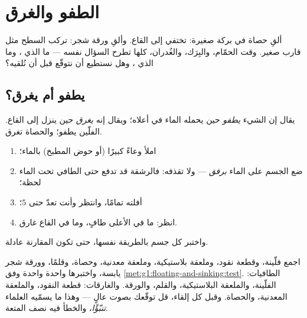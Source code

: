 \chapter{الطفو والغرق}\label{ch:g1:floating-and-sinking}

ألقِ حصاة في بركة صغيرة: تختفي إلى القاع. وألقِ ورقة شجر: تركب
السطح مثل قارب صغير. وقت الحمّام، والبِرَك، والغُدران، كلها تطرح
السؤال نفسه --- ما الذي ، وما الذي ، وهل نستطيع أن نتوقّع
قبل أن نُلقيه؟

\section{يطفو أم يغرق؟}

\begin{definition}\label{def:g1:floating-and-sinking:words}
يقال إن الشيء \emph{يطفو} حين يحمله الماء في أعلاه؛
ويقال إنه \emph{يغرق} حين ينزل إلى القاع. الفلّين يطفو؛
والحصاة تغرق.
\end{definition}

\begin{method}\label{met:g1:floating-and-sinking:test}
\begin{enumerate}
  \item املأ وعاءً كبيرًا (أو حوض المطبخ) بالماء؛
  \item ضع الجسم على الماء \emph{برفق} --- ولا تقذفه: فالرشقة قد
        تدفع حتى الطافي تحت الماء لحظة؛
  \item أفلته تمامًا، وانتظر وأنت تعدّ حتى $5$؛
  \item انظر: ما في الأعلى طافٍ، وما في القاع غارق.
\end{enumerate}
واختبر كل جسم بالطريقة نفسها، حتى تكون المقارنة عادلة.
\end{method}

\begin{example}\label{ex:g1:floating-and-sinking:sorting}
اجمع فلّينة، وقطعة نقود، وملعقة بلاستيكية، وملعقة معدنية، وحصاة،
وقلمًا، وورقة شجر يابسة، واختبرها واحدة واحدة
وفق \cref{met:g1:floating-and-sinking:test}. الطافيات: الفلّينة،
والملعقة البلاستيكية، والقلم، والورقة. والغارقات: قطعة النقود،
والملعقة المعدنية، والحصاة. وقبل كل إلقاء، قل توقّعك بصوت عالٍ ---
وهذا ما يسمّيه العلماء \emph{تنبّؤًا}، والخطأ فيه نصف المتعة.
\end{example}

